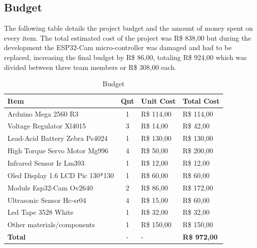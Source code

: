 \documentclass[a4paper,11pt]{article}
\begin{document}
\subsection{Budget}
The following table details the project budget and the amount of money spent on every item. The total estimated cost of the project was R\$ 838,00 but during the development the ESP32-Cam micro-controller was damaged and had to be replaced, increasing the final budget by R\$ 86,00, totaling R\$ 924,00 which was divided between three team members or R\$ 308,00 each.

\begin{table}[H]
  \small
  \caption{\small{Budget}}
  \begin{center}
    \begin{tabular}{|l|c|l|l|}
      \hline
      \textbf{Item}                    & \textbf{Qnt} & \textbf{Unit Cost} & \textbf{Total Cost} \\ \hline
      Arduino Mega 2560 R3             & 1            & R\$ 114,00         & R\$ 114,00          \\ \hline
      Voltage Regulator Xl4015         & 3            & R\$ 14,00          & R\$ 42,00           \\ \hline
      Lead-Acid Battery Zebra Ps4024   & 1            & R\$ 130,00         & R\$ 130,00          \\ \hline
      High Torque Servo Motor Mg996    & 4            & R\$ 50,00          & R\$ 200,00          \\ \hline
      Infrared Sensor Ir Lm393         & 1            & R\$ 12,00          & R\$ 12,00           \\ \hline
      Oled Display 1.6 LCD Pic 130*130 & 1            & R\$ 60,00          & R\$ 60,00           \\ \hline
      Module Esp32-Cam Ov2640          & 2            & R\$ 86,00          & R\$ 172,00          \\ \hline
      Ultrasonic Sensor Hc-sr04        & 4            & R\$ 15,00          & R\$ 60,00           \\ \hline
      Led Tape 3528 White              & 1            & R\$ 32,00          & R\$ 32,00           \\ \hline
      Other materials/components       & 1            & R\$ 150,00         & R\$ 150,00          \\ \hline
      \textbf{Total}                   & -            & -                  & \textbf{R\$ 972,00} \\ \hline
    \end{tabular}
  \end{center}
  \label{tab:budget}
\end{table}
\end{document}

